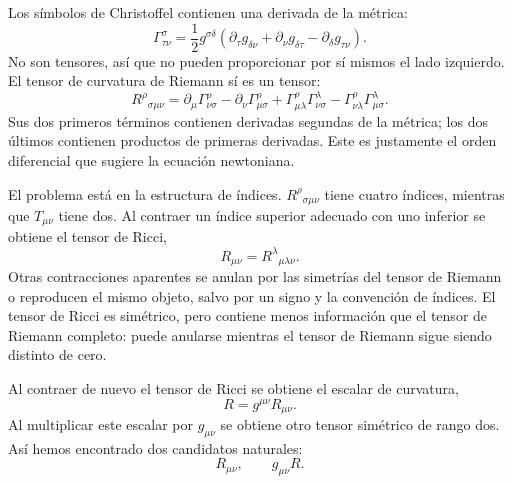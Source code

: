 Los símbolos de Christoffel contienen una derivada de la métrica:
\begin{equation}
 \Gamma^\sigma_{\tau\nu}
 =
 \frac12 g^{\sigma\delta}
 \left(
 \partial_\tau g_{\delta\nu}
 +\partial_\nu g_{\delta\tau}
 -\partial_\delta g_{\tau\nu}
 \right).
 \label{eq:christoffel}
\end{equation}
No son tensores, así que no pueden proporcionar por sí mismos el lado izquierdo. El tensor de curvatura de Riemann sí es un tensor:
\begin{equation}
 R^\rho{}_{\sigma\mu\nu}
 =
 \partial_\mu\Gamma^\rho_{\nu\sigma}
 -\partial_\nu\Gamma^\rho_{\mu\sigma}
 +\Gamma^\rho_{\mu\lambda}\Gamma^\lambda_{\nu\sigma}
 -\Gamma^\rho_{\nu\lambda}\Gamma^\lambda_{\mu\sigma}.
 \label{eq:riemann}
\end{equation}
Sus dos primeros términos contienen derivadas segundas de la métrica; los dos últimos contienen productos de primeras derivadas. Este es justamente el orden diferencial que sugiere la ecuación newtoniana.

El problema está en la estructura de índices. \(R^\rho{}_{\sigma\mu\nu}\) tiene cuatro índices, mientras que \(T_{\mu\nu}\) tiene dos. Al contraer un índice superior adecuado con uno inferior se obtiene el tensor de Ricci,
\begin{equation}
 R_{\mu\nu}=R^\lambda{}_{\mu\lambda\nu}.
 \label{eq:ricci}
\end{equation}
Otras contracciones aparentes se anulan por las simetrías del tensor de Riemann o reproducen el mismo objeto, salvo por un signo y la convención de índices. El tensor de Ricci es simétrico, pero contiene menos información que el tensor de Riemann completo: puede anularse mientras el tensor de Riemann sigue siendo distinto de cero.

\begin{classroomqa}
\end{classroomqa}

Al contraer de nuevo el tensor de Ricci se obtiene el escalar de curvatura,
\begin{equation}
 R=g^{\mu\nu}R_{\mu\nu}.
 \label{eq:ricci-scalar}
\end{equation}
Al multiplicar este escalar por \(g_{\mu\nu}\) se obtiene otro tensor simétrico de rango dos. Así hemos encontrado dos candidatos naturales:
\begin{equation}
 R_{\mu\nu},
 \qquad
 g_{\mu\nu}R.
\end{equation}


